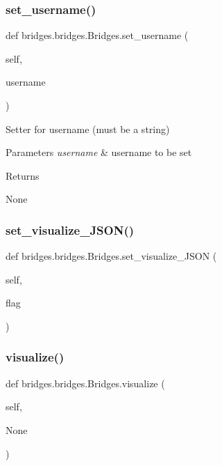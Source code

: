 \subsubsection{\texorpdfstring{set\+\_\+username()}{set\_username()}}
{\footnotesize\ttfamily def bridges.\+bridges.\+Bridges.\+set\+\_\+username (\begin{DoxyParamCaption}\item[{}]{self,  }\item[{}]{username }\end{DoxyParamCaption})}



Setter for username (must be a string) 


\begin{DoxyParams}{Parameters}
{\em username} & username to be set \\
\hline
\end{DoxyParams}
\begin{DoxyReturn}{Returns}


None 
\end{DoxyReturn}
\mbox{\label{classbridges_1_1bridges_1_1_bridges_ab50d018b5178ca33de24157b7b6de285}} 
\subsubsection{\texorpdfstring{set\+\_\+visualize\+\_\+\+J\+S\+O\+N()}{set\_visualize\_JSON()}}
{\footnotesize\ttfamily def bridges.\+bridges.\+Bridges.\+set\+\_\+visualize\+\_\+\+J\+S\+ON (\begin{DoxyParamCaption}\item[{}]{self,  }\item[{}]{flag }\end{DoxyParamCaption})}

\mbox{\label{classbridges_1_1bridges_1_1_bridges_a3c1321f8be7b249639a47eba10b67c70}} 
\subsubsection{\texorpdfstring{visualize()}{visualize()}}
{\footnotesize\ttfamily def bridges.\+bridges.\+Bridges.\+visualize (\begin{DoxyParamCaption}\item[{}]{self,  }\item[{}]{None }\end{DoxyParamCaption})}

